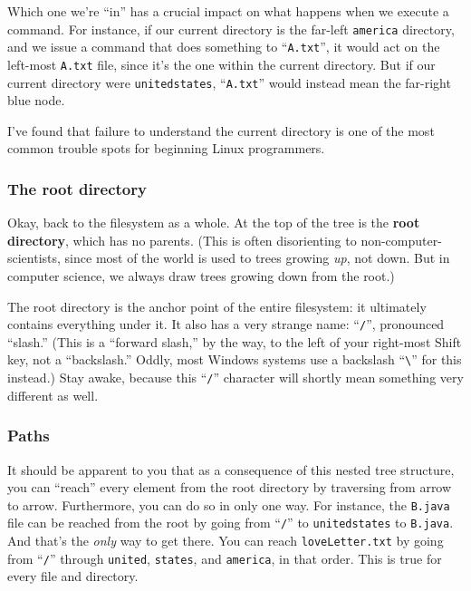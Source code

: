 Which one we're ``in'' has a crucial impact on what happens when we execute a
command. For instance, if our current directory is the far-left
\texttt{america} directory, and we issue a command that does something to
``\texttt{A.txt}'', it would act on the left-most \texttt{A.txt} file, since
it's the one within the current directory. But if our current directory were
\texttt{unitedstates}, ``\texttt{A.txt}'' would instead mean the far-right blue
node.

I've found that failure to understand the current directory is one of the most
common trouble spots for beginning Linux programmers.

\subsubsection{The root directory}

Okay, back to the filesystem as a whole. At the top of the tree is the
\textbf{root directory}, which has no parents. (This is often disorienting to
non-computer-scientists, since most of the world is used to trees growing
\textit{up}, not down. But in computer science, we always draw trees growing
down from the root.)

The root directory is the anchor point of the entire filesystem: it ultimately
contains everything under it. It also has a very strange name: ``\texttt{/}'',
pronounced ``slash.'' (This is a ``forward slash,'' by the way, to the left of
your right-most Shift key, not a ``backslash.'' Oddly, most Windows systems
use a backslash ``\texttt{\textbackslash}'' for this instead.) Stay awake,
because this ``\texttt{/}'' character will shortly mean something very
different as well.

\subsubsection{Paths}

It should be apparent to you that as a consequence of this nested tree
structure, you can ``reach'' every element from the root directory by
traversing from arrow to arrow. Furthermore, you can do so in only one way.
For instance, the \texttt{B.java} file can be reached from the root by going
from ``\texttt{/}'' to \texttt{unitedstates} to \texttt{B.java}. And that's the
\textit{only} way to get there. You can reach \texttt{loveLetter.txt} by going
from ``\texttt{/}'' through \texttt{united}, \texttt{states}, and
\texttt{america}, in that order. This is true for every file and directory.

